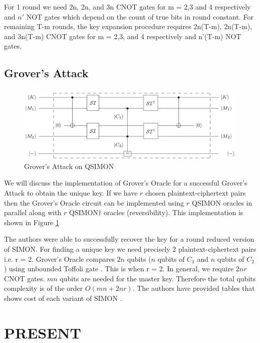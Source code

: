 \documentclass[preprint]{transcrypto}
\begin{document}
For 1 round we need 2n, 2n, and 3n CNOT gates for m = 2,3 and 4 respectively and $n'$ NOT gates which depend on the count of true bits in round constant. For remaining T-m rounds, the key expansion procedure requires 2n(T-m), 2n(T-m), and 3n(T-m) CNOT gates for m = 2,3, and 4 respectively and n'(T-m) NOT gates.
 
\subsection{Grover's Attack}\label{sec:qsimgrov}

\begin{figure}[h!]
    \centering
    \includegraphics[width=\linewidth]{simon/qsimgrov.png}
    \caption{Grover's Attack on QSIMON \cite{gos}}
    \label{fig:qsimgrov}
\end{figure}

We will discuss the implementation of Grover's Oracle for a successful Grover's Attack to obtain the unique key. If we have $r$ chosen plaintext-ciphertext pairs then the Grover's Oracle circuit can be implemented using $r$ QSIMON oracles in parallel along with $r$ QSIMON$\dagger$ oracles (reversibility). This implementation is shown in Figure \ref{fig:qsimgrov}


The authors were able to successfully recover the key for a round reduced version of SIMON. For finding a unique key we need precisely 2 plaintext-ciphertext pairs i.e. r = 2. Grover's Oracle compares $2n$ qubits ($n$ qubits of $C_1$ and $n$ qubits of $C_2$) using unbounded Toffoli gate \cite{mcmt}. This is when r = 2. In general, we require $2nr$ CNOT gates. $mn$ qubits are needed for the master key. Therefore the total qubits complexity is of the order $O(mn + 2nr)$. The authors have provided tables that shows cost of each variant of SIMON \cite{gos}.

\section{PRESENT}\label{sec:present}
\end{document}
